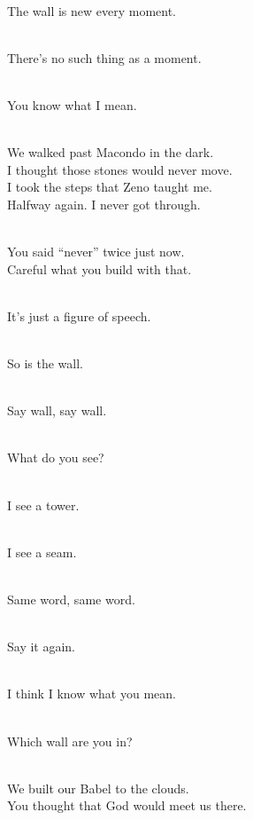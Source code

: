 \begin{lyrics}

\\
The wall is new every moment.

\\
There’s no such thing as a moment.

\\
You know what I mean.

\\
We walked past Macondo in the dark.\\
I thought those stones would never move.\\
I took the steps that Zeno taught me.\\
Halfway again. I never got through.

\\
You said “never” twice just now.\\
Careful what you build with that.

\\
It’s just a figure of speech.

\\
So is the wall.

\\
Say wall, say wall.

\\
What do you see?

\\
I see a tower.

\\
I see a seam.

\\
Same word, same word.

\\
Say it again.

\\
I think I know what you mean.

\\
Which wall are you in?


\\
We built our Babel to the clouds.\\
You thought that God would meet us there.


\end{lyrics}
